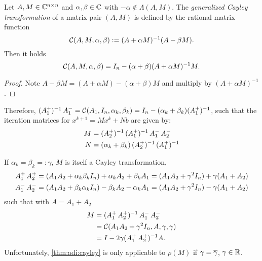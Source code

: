 \begin{lemma}
\label{thm:adi:cayley}
  Let $A, M\in\mathbb{C}^{n\times n}$ and $\alpha, \beta \in\mathbb{C}$ with $-\alpha\notin\Lambda(A, M)$.
  The \emph{generalized Cayley transformation} of a matrix pair $(A,M)$ is defined by
  the rational matrix function
  \begin{equation*}
    \mathcal{C}(A, M, \alpha, \beta) := (A+\alpha M)^{-1} (A-\beta M).
  \end{equation*}
  Then it holds
  \begin{equation*}
    \mathcal{C}(A, M, \alpha, \beta)
    = I_n - (\alpha+\beta) (A+\alpha M)^{-1} M
    .
  \end{equation*}
\end{lemma}
\begin{proof}
  Note $A-\beta M = (A+\alpha M) - (\alpha+\beta)M$
  and multiply by $(A+\alpha M)^{-1}$.
\end{proof}

Therefore,
$
  (\mathop{A_1^+})^{-1}\mathop{A_1^-}
  = \mathcal{C}(A_1, I_n, \alpha_k, \beta_k)
  = I_n - (\alpha_k+\beta_k)(\mathop{A_1^+})^{-1}
$,
such that the iteration matrices for $x^{k+1} = M x^k + N b$ are given by:
\begin{equation}
\label{eq:adi:general1step}
  \begin{aligned}
    M &= \mathop{(\mathop{A_2^+})^{-1}} \mathop{(\mathop{A_1^+})^{-1}} \mathop{A_1^-} \mathop{A_2^-} \\
    N &= (\alpha_k + \beta_k) \mathop{(\mathop{A_2^+})^{-1}} \mathop{(\mathop{A_1^+})^{-1}}
  \end{aligned}
\end{equation}

\begin{remark}
  If $\alpha_k = \beta_k =: \gamma$,
  $M$ is itself a Cayley transformation,
  \begin{align*}
    \mathop{A_1^+}\mathop{A_2^+}
    &= (A_1A_2 + \alpha_k\beta_k I_n) + \alpha_k A_2 + \beta_k  A_1
    = (A_1A_2 + \gamma^2 I_n) + \gamma(A_1 + A_2)
    \\
    \mathop{A_1^-}\mathop{A_2^-}
    &= (A_1A_2 + \beta_k\alpha_k I_n) - \beta_k  A_2 - \alpha_k A_1
    = (A_1A_2 + \gamma^2 I_n) - \gamma(A_1 + A_2)
  \end{align*}
  such that with $A=A_1+A_2$
  \begin{align*}
    M
    &= (\mathop{A_1^+}\mathop{A_2^+})^{-1} \mathop{A_1^-}\mathop{A_2^-} \\
    &= \mathcal C(A_1A_2 + \gamma^2 I_n, A, \gamma, \gamma) \\
    &= I - 2\gamma(\mathop{A_1^+} \mathop{A_2^+})^{-1} A
    .
  \end{align*}
  Unfortunately, \autoref{thm:adi:cayley} is only applicable to $\rho(M)$ if $\gamma=\conj\gamma$,
  \ie $\gamma\in\mathbb{R}$.
\end{remark}

